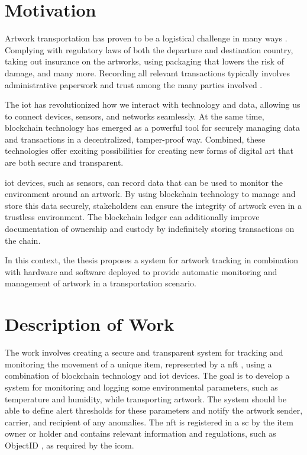 \section{Motivation}
Artwork transportation has proven to be a logistical challenge in many ways \cite{artintransit}. Complying with regulatory laws of both the departure and destination country, taking out insurance on the artworks, using packaging that lowers the risk of damage, and many more. Recording all relevant transactions typically involves administrative paperwork and trust among the many parties involved \cite{artintransit}.

The \gls{iot} has revolutionized how we interact with technology and data, allowing us to connect devices, sensors, and networks seamlessly. At the same time, blockchain technology has emerged as a powerful tool for securely managing data and transactions in a decentralized, tamper-proof way. Combined, these technologies offer exciting possibilities for creating new forms of digital art that are both secure and transparent.

\gls{iot} devices, such as sensors, can record data that can be used to monitor the environment around an artwork. By using blockchain technology to manage and store this data securely, stakeholders can ensure the integrity of artwork even in a trustless environment. The blockchain ledger can additionally improve documentation of ownership and custody by indefinitely storing transactions on the chain.

In this context, the thesis proposes a system for artwork tracking in combination with hardware and software deployed to provide automatic monitoring and management of artwork in a transportation scenario.

\section{Description of Work}
The work involves creating a secure and transparent system for tracking and monitoring the movement of a unique item, represented by a \gls{nft} \cite{nftminter}, using a combination of blockchain technology and \gls{iot} devices. The goal is to develop a system for monitoring and logging some environmental parameters, such as temperature and humidity, while transporting artwork. The system should be able to define alert thresholds for these parameters and notify the artwork sender, carrier, and recipient of any anomalies. The \gls{nft} is registered in a \gls{sc} by the item owner or holder and contains relevant information and regulations, such as ObjectID \cite{objectid}, as required by the \gls{icom}.

